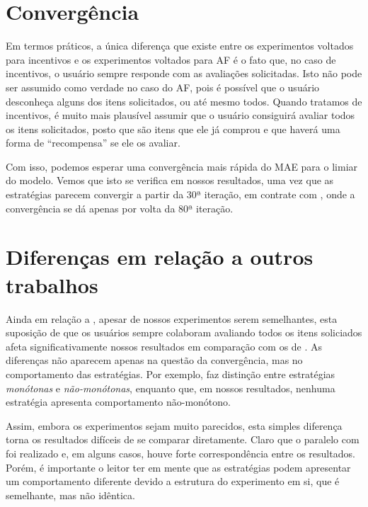 \section{Convergência}
 
Em termos práticos, a única diferença que existe entre os experimentos voltados para incentivos e os experimentos voltados para AF é o fato que, no caso de incentivos, o usuário sempre responde com as avaliações solicitadas. Isto não pode ser assumido como verdade no caso do AF, pois é possível que o usuário desconheça alguns dos itens solicitados, ou até mesmo todos. Quando tratamos de incentivos, é muito mais plausível assumir que o usuário consiguirá avaliar todos os itens solicitados, posto que são itens que ele já comprou e que haverá uma forma de ``recompensa'' se ele os avaliar.

Com isso, podemos esperar uma convergência mais rápida do MAE para o limiar do modelo. Vemos que isto se verifica em nossos resultados, uma vez que as estratégias parecem convergir a partir da 30ª iteração, em contrate com \citep{Elahi:2014:ALS:2542182.2542195}, onde a convergência se dá apenas por volta da 80ª iteração.

\section{Diferenças em relação a outros trabalhos}

Ainda em relação a \citep{Elahi:2014:ALS:2542182.2542195}, apesar de nossos experimentos serem semelhantes, esta suposição de que os usuários sempre colaboram avaliando todos os itens soliciados afeta significativamente nossos resultados em comparação com os de \citep{Elahi:2014:ALS:2542182.2542195}. As diferenças não aparecem apenas na questão da convergência, mas no comportamento das estratégias. Por exemplo, \citep{Elahi:2014:ALS:2542182.2542195} faz distinção entre estratégias \textit{monótonas} e \textit{não-monótonas}, enquanto que, em nossos resultados, nenhuma estratégia apresenta comportamento não-monótono.

Assim, embora os experimentos sejam muito parecidos, esta simples diferença torna os resultados difíceis de se comparar diretamente. Claro que o paralelo com \citep{Elahi:2014:ALS:2542182.2542195} foi realizado e, em alguns casos, houve forte correspondência entre os resultados. Porém, é importante o leitor ter em mente que as estratégias podem apresentar um comportamento diferente devido a estrutura do experimento em si, que é semelhante, mas não idêntica.

